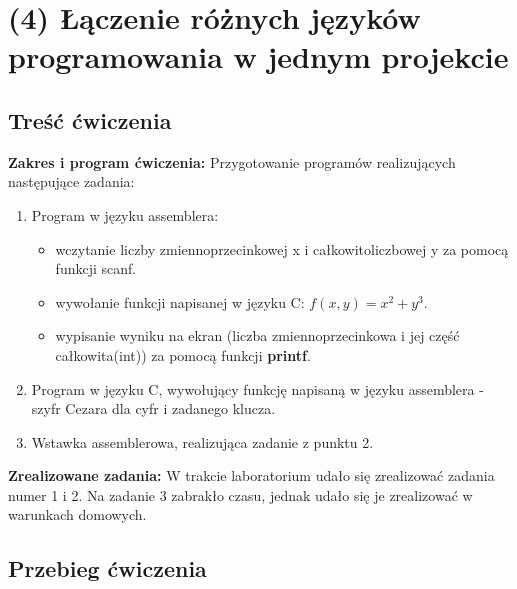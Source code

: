 \documentclass[a4paper,12pt]{article}
\begin{document}
\section{(4) Łączenie różnych języków programowania w jednym projekcie}
\subsection{Treść ćwiczenia}
\textbf{Zakres i program ćwiczenia:}
Przygotowanie programów realizujących następujące zadania:
\begin{enumerate}
	\item Program w języku assemblera:
	\begin{itemize}
		\item wczytanie liczby zmiennoprzecinkowej x i całkowitoliczbowej y za pomocą funkcji scanf.
		\item wywołanie funkcji napisanej w języku C: $f(x,y) = x^2+y^3$.
		\item wypisanie wyniku na ekran (liczba zmiennoprzecinkowa i jej część całkowita(int)) za pomocą funkcji \textbf{printf}.
	\end{itemize}
	\item Program w języku C, wywołujący funkcję napisaną w języku assemblera - szyfr Cezara dla cyfr i zadanego klucza.
	\item Wstawka assemblerowa, realizująca zadanie z punktu 2.
\end{enumerate}
\textbf{Zrealizowane zadania:}
W trakcie laboratorium udało się zrealizować zadania numer 1 i 2. Na zadanie 3 zabrakło czasu, jednak udało się je zrealizować w warunkach domowych. 
\subsection{Przebieg ćwiczenia}
\end{document}
